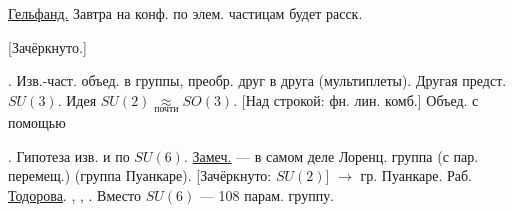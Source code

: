 \underline{Гельфанд.}
Завтра на конф. по элем. частицам будет расск.
\par\noindent\begin{minipage}{\linewidth}
[Зачёркнуто.]
\end{minipage}\par
{}.
Изв.-част. объед. в группы, преобр. друг в друга (мультиплеты).
Другая предст. $SU(3)$.
Идея $SU(2)\underset{\text{почти}}{\approx}SO(3)$.
[Над строкой: фн. лин. комб.]
Объед. с помощью .
Гипотеза изв. и по $SU(6)$.
\underline{Замеч.} — в самом деле Лоренц. группа (с пар. перемещ.)
(группа Пуанкаре).
[Зачёркнуто: $SU(2)$] $\longrightarrow$ гр. Пуанкаре.
Раб. \underline{Тодорова}.
, , .
Вместо $SU(6)$ — 108 парам. группу.

